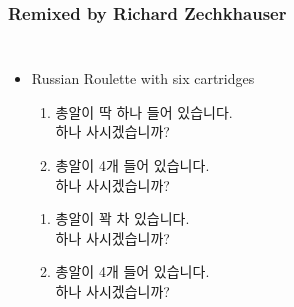 \documentclass[final]{beamer}
\begin{document}
\begin{frame}\frametitle{Remixed by Richard Zechkhauser}\vspace{2em}
\begin{columns}[c]
\column{18em}
\begin{itemize}
	\item Russian Roulette with six cartridges
	\begin{enumerate}
		\item 총알이 딱 하나 들어 있습니다. \\하나 사시겠습니까?
		\item 총알이 4개 들어 있습니다. \\하나 사시겠습니까? 
	\end{enumerate}
%
\vspace{1em}
\begin{enumerate}
		\item 총알이 꽉 차 있습니다. \\하나 사시겠습니까? 
		\item 총알이 4개 들어 있습니다. \\하나 사시겠습니까?
	\end{enumerate}
\end{itemize}
\column{14em}
\end{columns}
\end{frame}
%
\end{document}
